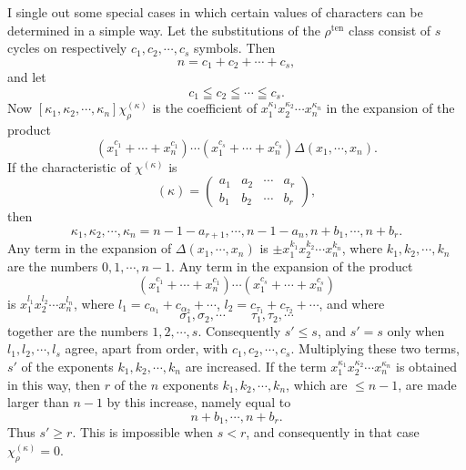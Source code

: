 \documentclass[11pt]{article}
\newcommand{\ten}{\mathrm{ten}}
\begin{document}
I single out some special cases in which certain values of characters can be determined in a simple way. Let the substitutions of the $\rho^{\ten}$ class consist of $s$ cycles on respectively $c_1,c_2,\cdots,c_s$ symbols. Then
\begin{equation}\tag{1.}
 n=c_1+c_2+
\cdots+c_s,
\end{equation}
and let
\begin{equation}\tag{2.}
 c_1\leqq c_2\leqq\cdots\leqq c_s.
\end{equation}
Now $[\kappa_1,
\kappa_2,
\cdots,
\kappa_n]\chi_\rho^{(\kappa)}$ is the coefficient of $x_1^{\kappa_1}x_2^{\kappa_2}\cdots x_n^{\kappa_n}$ in the expansion of the product
\begin{equation}\tag{3.}
 (x_1^{c_1}+
\cdots+x_n^{c_1})\cdots(x_1^{c_s}+
\cdots+x_n^{c_s})\Delta(x_1,
\cdots,x_n).
\end{equation}
If the characteristic of $\chi^{(\kappa)}$ is
\begin{equation}\tag{4.}
 (\kappa)=\left(\begin{matrix}a_1&a_2&\cdots&a_r\\ b_1&b_2&\cdots&b_r\end{matrix}\right),
\end{equation}
then
\[
 \kappa_1,
\kappa_2,
\cdots,
\kappa_n=n-1-a_{r+1},
\cdots,n-1-a_n,n+b_1,
\cdots,n+b_r.
\]
Any term in the expansion of $\Delta(x_1,\cdots,x_n)$ is $\pm x_1^{k_1}x_2^{k_2}\cdots x_n^{k_n}$, where $k_1,k_2,\cdots,k_n$ are the numbers $0,1,\cdots,n-1$. Any term in the expansion of the product
\begin{equation}\tag{5.}
 (x_1^{c_1}+
\cdots+x_n^{c_1})\cdots(x_1^{c_s}+
\cdots+x_n^{c_s})
\end{equation}
is $x_1^{l_1}x_2^{l_2}\cdots x_n^{l_n}$, where $l_1=c_{\alpha_1}+c_{\alpha_2}+\cdots$, $l_2=c_{\tau_1}+c_{\tau_2}+\cdots$, and where
\[
 \sigma_1,
\sigma_2,
\cdots\qquad \tau_1,
\tau_2,
\cdots
\]
together are the numbers $1,2,\cdots,s$. Consequently $s'\leq s$, and $s'=s$ only when $l_1,l_2,\cdots,l_s$ agree, apart from order, with $c_1,c_2,\cdots,c_s$. Multiplying these two terms, $s'$ of the exponents $k_1,k_2,\cdots,k_n$ are increased. If the term $x_1^{\kappa_1}x_2^{\kappa_2}\cdots x_n^{\kappa_n}$ is obtained in this way, then $r$ of the $n$ exponents $k_1,k_2,\cdots,k_n$, which are $\leq n-1$, are made larger than $n-1$ by this increase, namely equal to
\[
 n+b_1,
\cdots,n+b_r.
\]
Thus $s'\geq r$. This is impossible when $s<r$, and consequently in that case $\chi_\rho^{(\kappa)}=0$.
\end{document}
